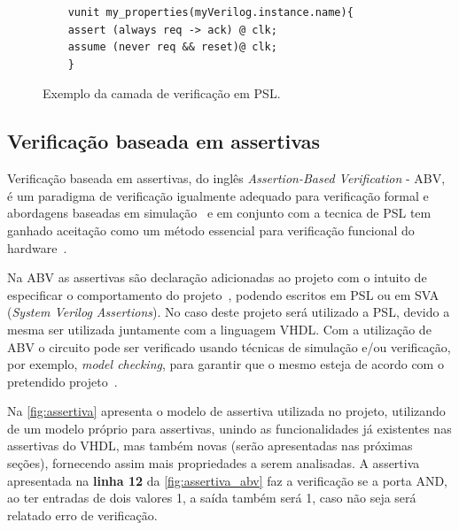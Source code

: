 \begin{figure}[H]
\caption{\label{fig:psl_example3} Exemplo da camada de verificação em PSL.}
	\begin{center}
    \begin{minipage}{0.7\textwidth}
    \begin{lstlisting}       
    vunit my_properties(myVerilog.instance.name){
    assert (always req -> ack) @ clk;
    assume (never req && reset)@ clk;
    }
    \end{lstlisting}
    \end{minipage}
	\end{center}
\end{figure}


\subsection{Verificação baseada em assertivas}

Verificação baseada em assertivas, do inglês \textit{Assertion-Based Verification} - ABV, é um paradigma de verificação igualmente adequado para verificação formal e abordagens baseadas em simulação~\cite{boule2005incorporating} e em conjunto com a tecnica de PSL tem ganhado aceitação como um método essencial para verificação funcional do hardware~\cite{DahanCombining}.

\par
Na ABV as assertivas são declaração adicionadas ao projeto com o intuito de especificar o comportamento do projeto~\cite{boule2005incorporating}, podendo escritos em PSL ou em SVA (\textit{System Verilog Assertions}). No caso deste projeto será utilizado a PSL, devido a mesma ser utilizada juntamente com a linguagem VHDL. Com a utilização de ABV o circuito pode ser verificado usando técnicas de simulação e/ou verificação, por exemplo, \textit{model checking}, para garantir que o mesmo esteja de acordo com o pretendido projeto~\cite{DahanCombining}.

\par
Na \autoref{fig:assertiva} apresenta o modelo de assertiva utilizada no projeto, utilizando de um modelo próprio para assertivas, unindo as funcionalidades já existentes nas assertivas do VHDL, mas também novas (serão apresentadas nas próximas seções), fornecendo assim mais propriedades a serem analisadas. A assertiva apresentada na \textbf{linha 12} da \autoref{fig:assertiva_abv} faz a verificação se a porta AND, ao ter entradas de dois valores 1, a saída também será 1, caso não seja será relatado erro de verificação.

